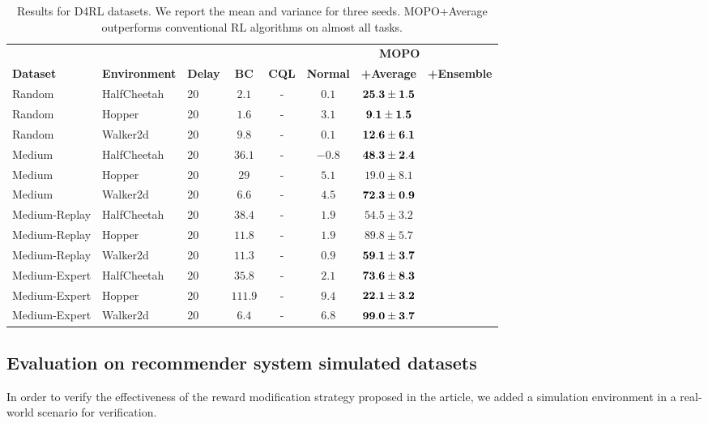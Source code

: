 \begin{table}[h]
\centering
\begin{tabular}{lll|cc|ccc}
\toprule
& & & & & \multicolumn{3}{c}{\bf MOPO} \\
\multicolumn{1}{l}{\bf Dataset} & \multicolumn{1}{c}{\bf Environment} & \multicolumn{1}{c|}{\bf Delay} & \multicolumn{1}{c}{\bf BC} & \multicolumn{1}{c|}{\bf CQL} & \multicolumn{1}{c}{\bf{Normal}} & \multicolumn{1}{c}{\bf +Average} & \multicolumn{1}{c}{\bf +Ensemble}\\
\midrule
Random        & HalfCheetah &  20 & $2.1$ &  -  &  $0.1$ &  $\bf{25.3 \pm 1.5 }$ \\
Random        & Hopper      &  20 & $1.6$ &  -  &  $3.1$ &  $\bf{9.1 \pm 1.5 }$ \\
Random        & Walker2d    &  20 & $9.8$ &  -  &  $0.1$ &  $\bf{12.6 \pm 6.1 }$ \\
\midrule
Medium        & HalfCheetah &  20 & $36.1$ &  - &  $-0.8$ &  $\bf{48.3 \pm 2.4}$ \\
Medium        & Hopper      &  20 & $29$ & - & $5.1$ &  $19.0 \pm 8.1$ \\
Medium        & Walker2d    &  20 & $6.6$ & - & $4.5$ &  $\bf{72.3 \pm 0.9}$ \\
\midrule
Medium-Replay & HalfCheetah &  20 & $38.4$ & - & $1.9$ &  $54.5 \pm 3.2$ \\
Medium-Replay & Hopper      &  20 & $11.8$ & - & $1.9$ &  $89.8 \pm 5.7$ \\
Medium-Replay & Walker2d    &  20 & $11.3$ & - & $0.9$ &  $\bf{59.1 \pm 3.7}$ \\
\midrule
Medium-Expert & HalfCheetah &  20 & $35.8$ & - & $2.1$ &  $\bf{73.6 \pm 8.3}$ \\
Medium-Expert & Hopper      &  20 & $111.9$ & - & $9.4$ &  $\bf{22.1 \pm 3.2}$ \\
Medium-Expert & Walker2d    &  20 & $6.4$  & - & $6.8$ & $\bf{99.0 \pm 3.7}$\\
\bottomrule
\end{tabular}
\caption{
Results for D4RL datasets\protect\footnotemark.
We report the mean and variance for three seeds.
MOPO+Average outperforms conventional RL algorithms on almost all tasks.}
\label{tbl:mujoco_results}
\end{table}

\subsection{Evaluation on recommender system simulated datasets}
In order to verify the effectiveness of the reward modification strategy proposed in the article, we added a simulation environment in a real-world scenario for verification.


